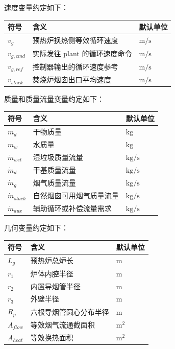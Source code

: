 \documentclass[UTF8,openany,zihao=-4,oneside]{ctexbook}
\begin{document}
速度变量约定如下：

\begin{longtable}[c]{@{}lll@{}}
\toprule\noalign{}
符号 & 含义 & 默认单位 \\
\midrule\noalign{}
\endhead
\bottomrule\noalign{}
\endlastfoot
\(v_g\) & 预热炉换热侧等效循环速度 & \(\mathrm{m/s}\) \\
\(v_{g,cmd}\) & 实际发往 plant 的循环速度命令 & \(\mathrm{m/s}\) \\
\(v_{g,ref}\) & 控制器输出的循环速度参考 & \(\mathrm{m/s}\) \\
\(v_{stack}\) & 焚烧炉烟囱出口平均速度 & \(\mathrm{m/s}\) \\
\end{longtable}

质量和质量流量变量约定如下：

\begin{longtable}[c]{@{}lll@{}}
\toprule\noalign{}
符号 & 含义 & 默认单位 \\
\midrule\noalign{}
\endhead
\bottomrule\noalign{}
\endlastfoot
\(m_d\) & 干物质量 & \(\mathrm{kg}\) \\
\(m_w\) & 水质量 & \(\mathrm{kg}\) \\
\(\dot m_{wet}\) & 湿垃圾质量流量 & \(\mathrm{kg/s}\) \\
\(\dot m_d\) & 干基质量流量 & \(\mathrm{kg/s}\) \\
\(\dot m_g\) & 烟气质量流量 & \(\mathrm{kg/s}\) \\
\(\dot m_{stack}\) & 自然烟囱可用烟气质量流量 & \(\mathrm{kg/s}\) \\
\(\dot m_{aux}\) & 辅助循环或补偿流量需求 & \(\mathrm{kg/s}\) \\
\end{longtable}

几何变量约定如下：

\begin{longtable}[c]{@{}lll@{}}
\toprule\noalign{}
符号 & 含义 & 默认单位 \\
\midrule\noalign{}
\endhead
\bottomrule\noalign{}
\endlastfoot
\(L_g\) & 预热炉总炉长 & \(\mathrm{m}\) \\
\(r_1\) & 炉体内腔半径 & \(\mathrm{m}\) \\
\(r_2\) & 内置导烟管半径 & \(\mathrm{m}\) \\
\(r_3\) & 外壁半径 & \(\mathrm{m}\) \\
\(R_p\) & 六根导烟管圆心分布半径 & \(\mathrm{m}\) \\
\(A_{flow}\) & 等效烟气流通截面积 & \(\mathrm{m^2}\) \\
\(A_{heat}\) & 等效换热面积 & \(\mathrm{m^2}\) \\
\end{longtable}
\end{document}
